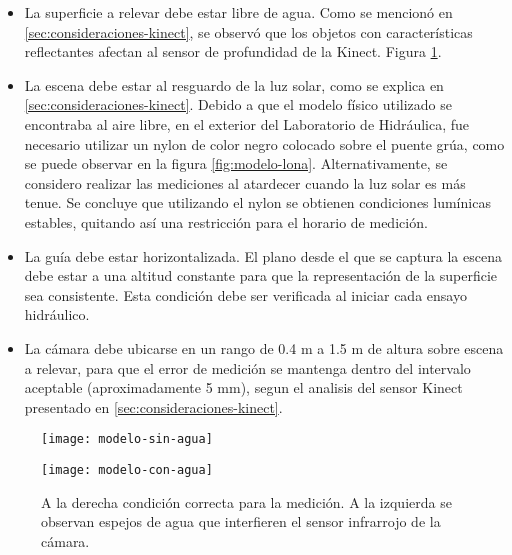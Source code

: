 \begin{itemize}

\item La superficie a relevar debe estar libre de agua. Como se mencionó en \ref{sec:consideraciones-kinect}, se observó que los objetos con características reflectantes afectan al sensor de profundidad de la Kinect. Figura \ref{fig:modelo-condiciones-agua}.

\item La escena debe estar al resguardo de la luz solar, como se explica en \ref{sec:consideraciones-kinect}. Debido a que el modelo físico utilizado se encontraba al aire libre, en el exterior del Laboratorio de Hidráulica, fue necesario utilizar un nylon de color negro colocado sobre el puente grúa, como se puede observar en la figura \ref{fig:modelo-lona}. Alternativamente, se considero realizar las mediciones al atardecer cuando la luz solar es más tenue. Se concluye que utilizando el nylon se obtienen condiciones lumínicas estables, quitando así una restricción para el horario de medición.

\item La guía debe estar horizontalizada. El plano desde el que se captura la escena debe estar a una altitud constante para que la representación de la superficie sea consistente. Esta condición debe ser verificada al iniciar cada ensayo hidráulico.

\item La cámara debe ubicarse en un rango de 0.4 m  a 1.5 m de altura sobre escena a relevar, para que el error de medición se mantenga dentro del intervalo aceptable (aproximadamente 5 mm), segun el analisis del sensor Kinect presentado en \ref{sec:consideraciones-kinect}.

\end{itemize}

\begin{figure}[ht]
\centering
\begin{minipage}[t]{.45\textwidth}
\begin{center}
\texttt{[image: modelo-sin-agua]} %
\end{center}
\end{minipage}
\hfill
\begin{minipage}[t]{.45\textwidth}
\begin{center}
\texttt{[image: modelo-con-agua]} %
\end{center}
\end{minipage}
\hfill
\caption{A la derecha condición correcta para la medición. A la izquierda se observan espejos de agua que interfieren el sensor infrarrojo de la cámara.}
\label{fig:modelo-condiciones-agua}
\end{figure}

